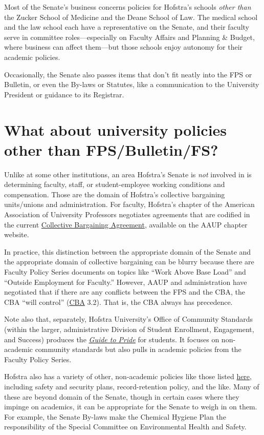 \documentclass[12pt]{article}
\begin{document}
Most of the Senate's business concerns policies for Hofstra's schools
\emph{other than} the Zucker School of Medicine and the Deane School of
Law. The medical school and the law school each have a representative on
the Senate, and their faculty serve in committee roles---especially on
Faculty Affairs and Planning \& Budget, where business can affect
them---but those schools enjoy autonomy for their academic policies.

Occasionally, the Senate also passes items that don't fit neatly into
the FPS or Bulletin, or even the By-laws or Statutes, like a communication to the
University President or guidance to its Registrar.

\section{What about university policies other than
FPS/Bulletin/FS?}\label{what-about-university-policies-other-than-fpsbulletinfs}

Unlike at some other institutions, an area Hofstra's Senate is
\emph{not} involved in is determining faculty, staff, or
student-employee working conditions and compensation. Those are the
domain of Hofstra's collective bargaining units/unions and
administration. For faculty, Hofstra's chapter of the American
Association of University Professors negotiates agreements that are
codified in the current \href{https://aaup-hofstra.org}{Collective
Bargaining Agreement}, available on the AAUP chapter website.

In practice, this distinction between the appropriate domain of the
Senate and the appropriate domain of collective bargaining can be blurry
because there are Faculty Policy Series documents on topics like ``Work
Above Base Load'' and ``Outside Employment for Faculty.'' However, AAUP
and administration have negotiated that if there are any conflicts
between the FPS and the CBA, the CBA ``will control''
(\href{https://aaup-hofstra.org}{CBA} 3.2). That is, the CBA always has
precedence.

Note also that, separately, Hofstra University's Office of Community
Standards (within the larger, administrative Division of Student
Enrollment, Engagement, and Success) produces the
\href{https://sites.google.com/hofstra.edu/guide-to-pride/home}{\emph{Guide
to Pride}} for students. It focuses on non-academic community standards
but also pulls in academic policies from the Faculty Policy Series.

Hofstra also has a variety of other, non-academic policies like those
listed \href{https://www.hofstra.edu/about/policies.html}{here},
including safety and security plans, record-retention policy, and the
like. Many of these are beyond domain of the Senate, though in certain
cases where they impinge on academics, it can be appropriate for the
Senate to weigh in on them. For example, the Senate By-laws make the
Chemical Hygiene Plan the responsibility of the Special Committee on
Environmental Health and Safety.
\end{document}
